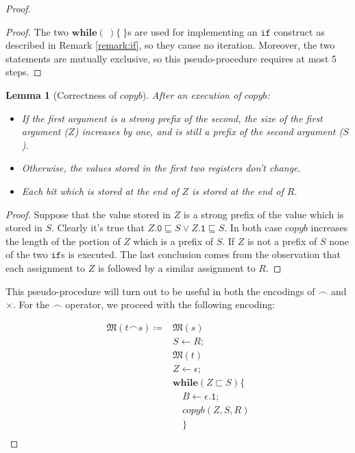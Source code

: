\documentclass[10pt]{amsart}
\newcommand{\conc}{\frown}
\newcommand{\zero}{\mathtt{0}}
\newcommand{\one}{\mathtt{1}}
\newcommand{\If}{\mathtt{if}}
\newcommand{\while}[2]{\mathbf{while}(#1)\{#2\}}
\newcommand{\takes}{\leftarrow}
\newcommand{\MM}{\mathfrak M}
\newtheorem{lemma}{Lemma}
\begin{document}
\begin{proof}
\begin{proof}
The two $\while \ \ $s are used for implementing an $\If$ construct as described in Remark \ref{remark:if}, so they cause no iteration. Moreover, the two statements are mutually exclusive, so this pseudo-procedure requires at most 5 steps.
\end{proof}

\begin{lemma}[Correctness of $copyb$]
\label{lemma:corrcopyb}
After an execution of $copyb$:
\begin{itemize}
\item If the first argument is a strong prefix of the second, the size of the first argument ($Z$) increases by one, and is still a prefix of the second argument ($S$).
\item Otherwise, the values stored in the first two registers don't change.
\item Each bit which is stored at the end of $Z$ is stored at the end of $R$.
\end{itemize}
\end{lemma}

\begin{proof}
Suppose that the value stored in $Z$ is a strong prefix of the value which is stored in $S$. Clearly it's true that $Z.\zero \sqsubseteq S \lor Z.\one\sqsubseteq S$. In both case $copyb$ increases the length of the portion of $Z$ which is a prefix of $S$. If $Z$ is not a prefix of $S$ none of the two $\If$s is executed. The last conclusion comes from the observation that each assignment to $Z$ is followed by a similar assignment to $R$.
\end{proof}

This pseudo-procedure will turn out to be useful in both the encodings of $\conc$ and $\times$. For the $\conc$ operator, we proceed with the following encoding:

\begin{align*}
\MM(t \conc s)\coloneqq &\MM(s)\\
& S \takes R;\\
& \MM(t)\\
& Z \takes \epsilon; \\
& \while {Z \sqsubset S}{\\
& \quad B \takes \epsilon.\one; \\
& \quad copyb(Z, S, R)\\
& \quad }\\
\end{align*}


\end{proof}
\end{document}
